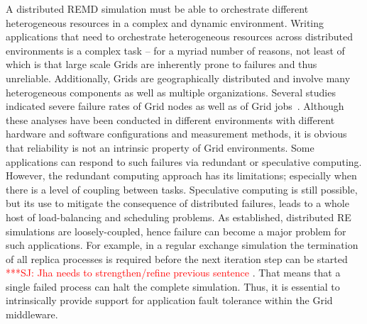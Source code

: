 \documentclass[times, 10pt,twocolumn]{article}
\newcommand{\kimnote}[1]{ {\textcolor{green} { ***JK: #1 }}}
\newcommand{\jhanote}[1]{ {\textcolor{red} { ***SJ: #1 }}}
\newcommand{\kimnote}[1]{}
\newcommand{\jhanote}[1]{}
\begin{document}
  

              

A distributed REMD simulation must be able to orchestrate different
heterogeneous resources in a complex and dynamic environment.  Writing
applications that need to orchestrate heterogeneous resources
across distributed environments is a complex task -- for a myriad
number of reasons, not least of which is that  large scale
Grids are inherently prone to failures and thus unreliable.
Additionally, Grids are geographically distributed and involve many
heterogeneous components as well as multiple organizations.  Several
studies indicated severe failure rates of Grid nodes as well as of
Grid
jobs~\cite{schroeder,10.1109/E-SCIENCE.2006.93,DBLP:conf/grid/KhaliliHOSC06}.
Although these analyses have been conducted in different environments
with different hardware and software configurations and measurement
methods, it is obvious that reliability is not an intrinsic property
of Grid environments. Some applications can respond to such failures
via redundant or speculative computing.  However, the redundant
computing approach has its limitations; especially when there is a
level of coupling between tasks.  Speculative computing is still
possible, but its use to mitigate the consequence of distributed
failures, leads to a whole host of load-balancing and scheduling
problems.  As established, distributed RE simulations are
loosely-coupled, hence failure can become a major problem for such
applications.  For example, in a regular exchange simulation the
termination of all replica processes is required before the next
iteration step can be started \jhanote{Jha needs to strengthen/refine
  previous sentence}. That means that a single failed process can halt
the complete simulation.  Thus, it is essential to intrinsically
provide support for application fault tolerance within the Grid
middleware.
\end{document}
